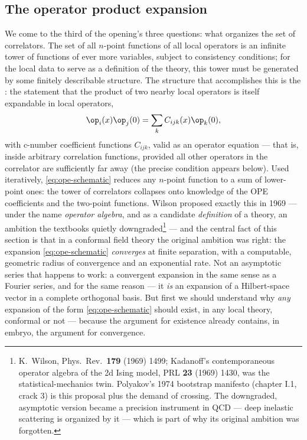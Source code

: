 \subsection{The operator product expansion}
\label{sec:ope}

We come to the third of the opening's three questions: what organizes the
set of correlators. The set of all $n$-point functions of all local
operators is an infinite tower of functions of ever more variables, subject
to consistency conditions; for the local data to serve as a definition of
the theory, this tower must be generated by some finitely describable
structure. The structure that accomplishes this is the : the statement that the product of two nearby local
operators is itself expandable in local operators,
\begin{equation}
\op_i(x)\op_j(0) = \sum_{k} C_{ijk}(x) \op_k(0),
\label{eq:ope-schematic}
\end{equation}
with c-number coefficient functions $C_{ijk}$, valid as an operator equation
--- that is, inside arbitrary correlation functions, provided all other
operators in the correlator are sufficiently far away (the precise condition
appears below). Used iteratively, \eqref{eq:ope-schematic} reduces any
$n$-point function to a sum of lower-point ones: the tower of correlators
collapses onto knowledge of the OPE coefficients and the two-point functions.
Wilson proposed exactly this in 1969 --- under the name \emph{operator
algebra}, and as a candidate \emph{definition} of a theory, an ambition the
textbooks quietly downgraded\footnote{K.~Wilson, Phys.\ Rev.\ \textbf{179}
(1969) 1499; Kadanoff's contemporaneous operator algebra of the 2d Ising
model, PRL \textbf{23} (1969) 1430, was the statistical-mechanics twin.
Polyakov's 1974 bootstrap manifesto (chapter I.1, crack 3) is this proposal
plus the demand of crossing. The downgraded, asymptotic version became a
precision instrument in QCD --- deep inelastic scattering is organized by it
--- which is part of why its original ambition was forgotten.} --- and the
central fact of this section is that in a conformal field theory the original
ambition was right: the expansion \eqref{eq:ope-schematic} \emph{converges} at
finite separation, with a computable, geometric radius of convergence and an
exponential rate. Not an asymptotic series that happens to work: a convergent
expansion in the same sense as a Fourier series, and for the same reason ---
it \emph{is} an expansion of a Hilbert-space vector in a complete orthogonal
basis. But first we should understand why \emph{any} expansion of the form
\eqref{eq:ope-schematic} should exist, in any local theory, conformal or not
--- because the argument for existence already contains, in embryo, the
argument for convergence.

